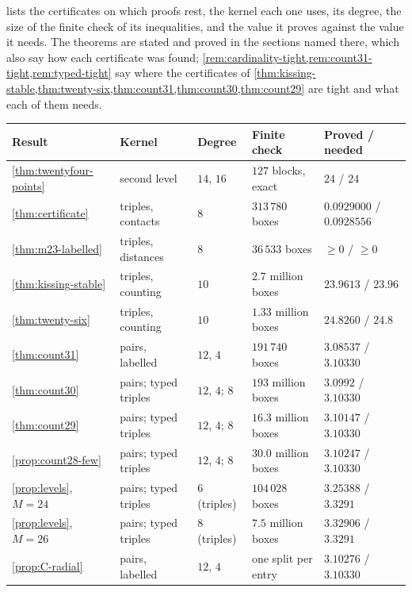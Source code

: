 \documentclass[11pt,reqno]{amsart}
\renewcommand{\_}{\origunderscore\allowbreak}
\numberwithin{equation}{section}
\theoremstyle{plain}
\theoremstyle{definition}
\theoremstyle{remark}
\begin{document}
 lists the certificates on which proofs rest, the
kernel each one uses, its degree, the size of the finite check of its
inequalities, and the value it proves against the value it needs. The
theorems are stated and proved in the sections named there, which also
say how each certificate was found;
\cref{rem:cardinality-tight,rem:count31-tight,rem:typed-tight} say where the
certificates of
\cref{thm:kissing-stable,thm:twenty-six,thm:count31,thm:count30,thm:count29}
are tight and what each of them needs.

\begin{table}[htbp]
\centering
\footnotesize
\setlength{\tabcolsep}{4pt}
\begin{tabular}{@{}lllll@{}}
\toprule
Result & Kernel & Degree & Finite check & Proved / needed\\
\midrule
\cref{thm:twentyfour-points} & second level \cite{LLM24} & $14$, $16$ & $127$ blocks, exact & $24$ / $24$\\
\cref{thm:certificate} & triples, contacts & $8$ & $313\,780$ boxes & $0.0929000$ / $0.0928556$\\
\cref{thm:m23-labelled} & triples, distances & $8$ & $36\,533$ boxes & $\ge0$ / $\ge0$\\
\cref{thm:kissing-stable} & triples, counting & $10$ & $2.7$ million boxes & $23.9613$ / $23.96$\\
\cref{thm:twenty-six} & triples, counting & $10$ & $1.33$ million boxes & $24.8260$ / $24.8$\\
\cref{thm:count31} & pairs, labelled & $12$, $4$ & $191\,740$ boxes & $3.08537$ / $3.10330$\\
\cref{thm:count30} & pairs; typed triples & $12$, $4$; $8$ & $193$ million boxes & $3.0992$ / $3.10330$\\
\cref{thm:count29} & pairs; typed triples & $12$, $4$; $8$ & $16.3$ million boxes & $3.10147$ / $3.10330$\\
\cref{prop:count28-few} & pairs; typed triples & $12$, $4$; $8$ & $30.0$ million boxes & $3.10247$ / $3.10330$\\
\cref{prop:levels}, $M=24$ & pairs; typed triples & $6$ (triples) & $104\,028$ boxes & $3.25388$ / $3.3291$\\
\cref{prop:levels}, $M=26$ & pairs; typed triples & $8$ (triples) & $7.5$ million boxes & $3.32906$ / $3.3291$\\
\cref{prop:C-radial} & pairs, labelled & $12$, $4$ & one split per entry & $3.10276$ / $3.10330$\\
\bottomrule
\end{tabular}

\end{table}
\end{document}

